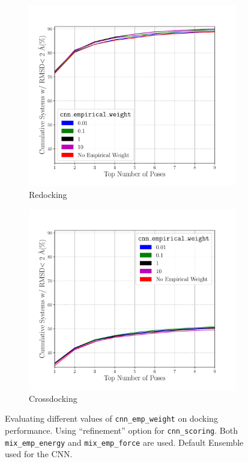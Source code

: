\documentclass[journal=jcisd8,manuscript=article]{achemso}
\begin{document}
\begin{figure}    
        \begin{subfigure}[b]{0.48\textwidth}    
		\centering
		\includegraphics[width=\textwidth]{figures/redocking/refine_sweep_cnn_empirical_weight_line.pdf}
		\caption{Redocking}
		\label{fig:CNNEmpWeight}
        \end{subfigure}    
        \begin{subfigure}[b]{0.48\textwidth}    
		\centering
		\includegraphics[width=\textwidth]{figures/crossdocking/refine_sweep_cnn_empirical_weight_line.pdf}
		\caption{Crossdocking}
		\label{fig:CNNEmpWeight}
        \end{subfigure}    
	\caption{Evaluating different values of \texttt{cnn\_emp\_weight} on docking performance. Using ``refinement'' option for \texttt{cnn\_scoring}. Both \texttt{mix\_emp\_energy} and \texttt{mix\_emp\_force} are used. Default Ensemble used for the CNN.}
	\label{fig:CNNEmpWeight}
\end{figure} 
\end{document}
